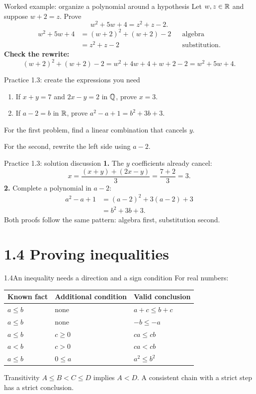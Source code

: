 \begin{frame}{Worked example: organize a polynomial around a hypothesis}
Let $w,z\in\mathbb{R}$ and suppose $w+2=z$. Prove
\[
w^2+5w+4=z^2+z-2.
\]
\[
\begin{aligned}
w^2+5w+4
  &=(w+2)^2+(w+2)-2&&\text{algebra}\\
  &=z^2+z-2&&\text{substitution}.
\end{aligned}
\]
\textbf{Check the rewrite:}
\[
(w+2)^2+(w+2)-2=w^2+4w+4+w+2-2=w^2+5w+4.
\]
\end{frame}

\begin{frame}{Practice 1.3: create the expressions you need}
\begin{enumerate}
\item If $x+y=7$ and $2x-y=2$ in $\mathbb{Q}$, prove $x=3$.
\item If $a-2=b$ in $\mathbb{R}$, prove $a^2-a+1=b^2+3b+3$.
\end{enumerate}
\vspace{1em}
For the first problem, find a linear combination that cancels $y$.

For the second, rewrite the left side using $a-2$.
\end{frame}

\begin{frame}{Practice 1.3: solution discussion}
\textbf{1.} The $y$ coefficients already cancel:
\[
x=\frac{(x+y)+(2x-y)}3=\frac{7+2}3=3.
\]
\textbf{2.} Complete a polynomial in $a-2$:
\[
\begin{aligned}
a^2-a+1&=(a-2)^2+3(a-2)+3\\
        &=b^2+3b+3.
\end{aligned}
\]
Both proofs follow the same pattern: algebra first, substitution second.
\end{frame}

\section{1.4 Proving inequalities}
\begin{frame}{1.4\quad An inequality needs a direction and a sign condition}
For real numbers:
\begin{center}
\begin{tabular}{lll}
\toprule
Known fact & Additional condition & Valid conclusion \\
\midrule
$a\le b$ & none & $a+c\le b+c$ \\
$a\le b$ & none & $-b\le-a$ \\
$a\le b$ & $c\ge0$ & $ca\le cb$ \\
$a<b$ & $c>0$ & $ca<cb$ \\
$a\le b$ & $0\le a$ & $a^2\le b^2$ \\
\bottomrule
\end{tabular}
\end{center}
\begin{block}{Transitivity}
$A\le B<C\le D$ implies $A<D$.
A consistent chain with a strict step has a strict conclusion.
\end{block}
\end{frame}

